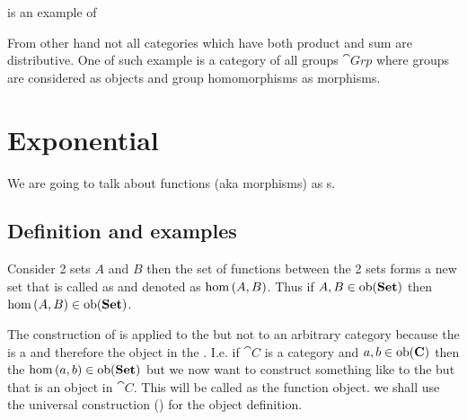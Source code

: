\begin{example}
\label{ex:distributive_category}
 is an example 
\cite{wiki:distributive_category}
of 

From other hand not all categories which have both product and sum are
distributive. One of such example is a category of all groups
$\cat{Grp}$ \cite{wiki:distributive_category}  where groups are
considered as objects and group homomorphisms as morphisms.  
\end{example}

\section{Exponential}
We are going to talk about functions (aka morphisms) as
s. 

\subsection{Definition and examples}
\begin{example}[Homset]
\label{ex:homset}
Consider 2 sets $A$ and $B$ then the set of functions between the 2 sets
forms a new set that is called as  and denoted
as $\catmset{A}{B}$. Thus if $A,B \in \mathrm{ob}(\mathbf{Set})$ then 
$\catmset{A}{B} \in \catob{Set}$. 
\end{example}

The construction of  is applied to
the  but not to an arbitrary category because
the  is a  and therefore the
object in the . I.e. if $\cat{C}$ is a
category and $a, b \in \mathrm{ob}(\mathbf{C})$ 
then the  $\catmset{a}{b} \in \catob{Set}$ but
we now want to construct something like to the 
but that is an object in $\cat{C}$. This will be called as the
function object. we shall use the universal construction
() for the object definition. 

